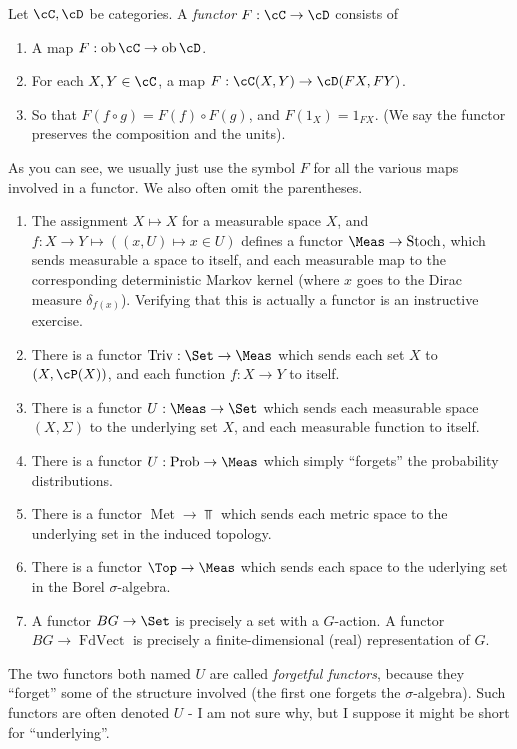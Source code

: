\documentclass{article}
\DeclareMathOperator{\ob}{ob}
\DeclareMathOperator{\Met}{Met}
\DeclareMathOperator{\FdVect}{FdVect}
\DeclareMathOperator{\Stoch}{Stoch}
\DeclareMathOperator{\Prob}{Prob}
\DeclareMathOperator{\Triv}{Triv}
\begin{document}
\begin{definition}
    Let $\cC, \cD$ be categories. A \emph{functor} $F: \cC \to \cD$ consists of
    \begin{enumerate}
        \item A map $F: \ob \cC \to \ob \cD$.
        \item For each $X,Y \in \cC$, a map $F: \cC(X,Y) \to \cD(FX,FY)$.
        \item So that $F(f\circ g) = F(f) \circ F(g)$, and $F(1_X) = 1_{FX}$. (We say the functor preserves the composition and the units).
    \end{enumerate}
\end{definition}
As you can see, we usually just use the symbol $F$ for all the various maps involved in a functor. We also often omit the parentheses.

\begin{example}
    \begin{enumerate}
    \item The assignment $X \mapsto X$ for a measurable space $X$, and $f: X \to Y \mapsto ((x,U) \mapsto x \in U)$ defines a functor $\Meas \to \Stoch$,
    which sends measurable a space to itself, and each measurable map to the corresponding deterministic Markov kernel (where $x$ goes to the Dirac measure $\delta_{f(x)}$).
    Verifying that this is actually a functor is an instructive exercise.
    \item There is a functor $\Triv: \Set \to \Meas$ which sends each set $X$ to $(X,\cP(X))$, and each function $f: X \to Y$ to itself.
    \item There is a functor $U: \Meas \to \Set$ which sends each measurable space $(X,\Sigma)$ to the underlying set $X$, and each measurable function to itself.
    \item There is a functor $U: \Prob \to \Meas$ which simply ``forgets'' the probability distributions.
    \item There is a functor $\Met \to \Top$ which sends each metric space to the underlying set in the induced topology.
    \item There is a functor $\Top \to \Meas$ which sends each space to the uderlying set in the Borel $\sigma$-algebra.
    \item A functor $BG \to \Set$ is precisely a set with a $G$-action. A functor $BG \to \FdVect$ is precisely a finite-dimensional (real) representation of $G$.
    \end{enumerate}
\end{example}
The two functors both named $U$ are called \emph{forgetful functors}, because they ``forget'' some of the structure involved (the first one forgets the $\sigma$-algebra).
Such functors are often denoted $U$ - I am not sure why, but I suppose it might be short for ``underlying''.
\end{document}
